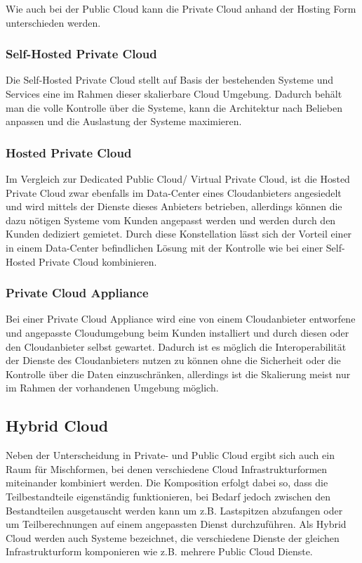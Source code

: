 \documentclass[journal]{IEEEtran}
\begin{document}
Wie auch bei der Public Cloud kann die Private Cloud anhand der Hosting Form unterschieden werden.

\subsubsection{Self-Hosted Private Cloud}
Die Self-Hosted Private Cloud stellt auf Basis der bestehenden Systeme und Services eine im Rahmen dieser skalierbare Cloud Umgebung. Dadurch behält man die volle Kontrolle über die Systeme, kann die Architektur nach Belieben anpassen und die Auslastung der Systeme maximieren.

\subsubsection{Hosted Private Cloud}
Im Vergleich zur Dedicated Public Cloud/ Virtual Private Cloud, ist die Hosted Private Cloud zwar ebenfalls im Data-Center eines Cloudanbieters angesiedelt und wird mittels der Dienste dieses Anbieters betrieben, allerdings können die dazu nötigen Systeme vom Kunden angepasst werden und werden durch den Kunden dediziert gemietet. Durch diese Konstellation lässt sich der Vorteil einer in einem Data-Center befindlichen Lösung mit der Kontrolle wie bei einer Self-Hosted Private Cloud kombinieren.

\subsubsection{Private Cloud Appliance}
Bei einer Private Cloud Appliance wird eine von einem Cloudanbieter entworfene und angepasste Cloudumgebung beim Kunden installiert und durch diesen oder den Cloudanbieter selbst gewartet. Dadurch ist es möglich die Interoperabilität der Dienste des Cloudanbieters nutzen zu können ohne die Sicherheit oder die Kontrolle über die Daten einzuschränken, allerdings ist die Skalierung meist nur im Rahmen der vorhandenen Umgebung möglich.

\subsection{Hybrid Cloud}
Neben der Unterscheidung in Private- und Public Cloud ergibt sich auch ein Raum für Mischformen, bei denen verschiedene Cloud Infrastrukturformen miteinander kombiniert werden. Die Komposition erfolgt dabei so, dass die Teilbestandteile eigenständig funktionieren, bei Bedarf jedoch zwischen den Bestandteilen ausgetauscht werden kann um z.B. Lastspitzen abzufangen oder um Teilberechnungen auf einem angepassten Dienst durchzuführen. Als Hybrid Cloud werden auch Systeme bezeichnet, die verschiedene Dienste der gleichen Infrastrukturform komponieren wie z.B. mehrere Public Cloud Dienste.
\end{document}
